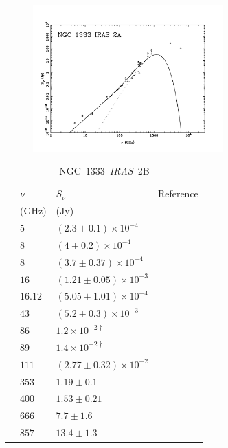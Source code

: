 \documentclass[9pt]{extarticle}   	%
\begin{document}
\begin{figure}[htbp]
\begin{center}
\includegraphics[width=0.65\textwidth]{plots/HH7-11-IRAS2A.pdf}
\label{default}
\end{center}
\end{figure}

\clearpage



\begin{table}
\caption{NGC~$1333$~\textit{IRAS}~$2$B}
\begin{center}
\begin{tabular}{llll}
\hline
 & $\nu$ & $S_\nu$ & Reference\\
 & (GHz) & (Jy) & \\
\hline
 & $5$ & $(2.3\pm0.1)\times10^{-4}$ & \citet{1999ApJS..125..427R}\\
 & $8$ & $(4\pm0.2)\times10^{-4}$ & \citet{1999ApJS..125..427R}\\
 & $8$ & $(3.7\pm0.37)\times10^{-4}$ & \citet{2002AJ....124.1045R}\\
 & $16$ & $(1.21\pm0.05)\times10^{-3}$ & \citet{2011MNRAS.415..893A}\\
 & $16.12$ & $(5.05\pm1.01)\times10^{-4}$ & \citet{2012MNRAS.423.1089A}\\
 & $43$ & $(5.2\pm0.3)\times10^{-3}$ & \citet{2004ApJ...605L.137A}\\
 & $86$ & $1.2\times10^{-2\dag}$ & \citet{2004AA...413..993J}\\
 & $89$ & $1.4\times10^{-2\dag}$ & \citet{2004AA...413..993J}\\
 & $111$ & $(2.77\pm0.32)\times10^{-2}$ & \citet{2000ApJ...529..477L}\\
 & $353$ & $1.19\pm0.1$ & \citet{2000ApJ...530..851C}\\
 & $400$ & $1.53\pm0.21$ & \citet{2000ApJ...530..851C}\\
 & $666$ & $7.7\pm1.6$ & \citet{2000ApJ...530..851C}\\
 & $857$ & $13.4\pm1.3$ & \citet{2000ApJ...530..851C}\\
\end{tabular}
\end{center}
\label{default}
\end{table}%
\end{document}
